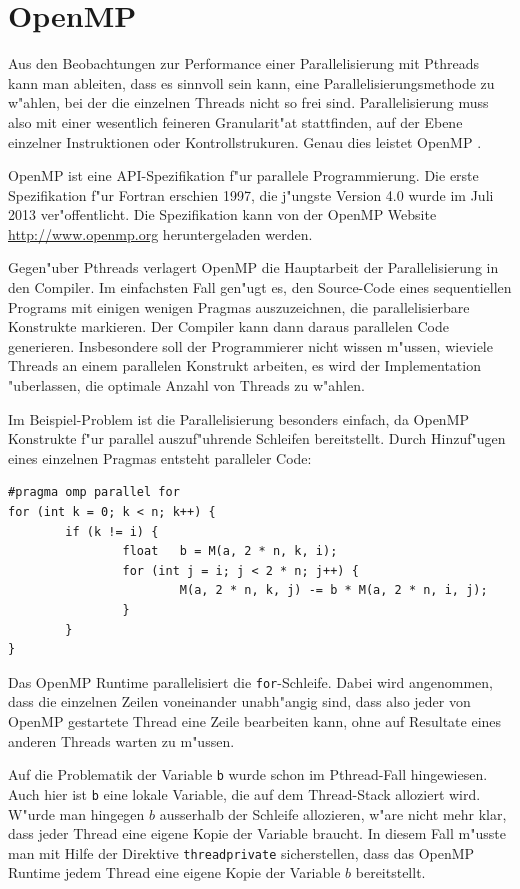 \section{OpenMP\label{openmp-intro}}
Aus den Beobachtungen zur Performance einer Parallelisierung mit
Pthreads kann man ableiten, dass es sinnvoll sein kann,
eine Parallelisierungsmethode zu w"ahlen, bei der die einzelnen
Threads nicht so frei sind.
Parallelisierung muss also mit einer wesentlich feineren Granularit"at
stattfinden, auf der Ebene einzelner Instruktionen oder Kontrollstrukuren.
Genau dies leistet OpenMP \cite{skript:openmp}.

OpenMP ist eine API-Spezifikation f"ur parallele Programmierung.
Die erste Spezifikation f"ur Fortran erschien 1997, die j"ungste 
Version 4.0 wurde im Juli 2013 ver"offentlicht.
Die Spezifikation kann von der OpenMP Website \url{http://www.openmp.org}
heruntergeladen werden.

Gegen"uber Pthreads verlagert OpenMP die Hauptarbeit der Parallelisierung
in den Compiler. 
Im einfachsten Fall gen"ugt es, den Source-Code eines sequentiellen Programs
mit einigen wenigen Pragmas auszuzeichnen, die parallelisierbare
Konstrukte markieren. Der Compiler kann dann daraus parallelen Code
generieren. Insbesondere soll der Programmierer nicht wissen m"ussen, wieviele
Threads an einem parallelen Konstrukt arbeiten, es wird der Implementation
"uberlassen, die optimale Anzahl von Threads zu w"ahlen.

Im Beispiel-Problem ist die Parallelisierung besonders einfach, da
OpenMP Konstrukte f"ur parallel auszuf"uhrende Schleifen bereitstellt.
Durch Hinzuf"ugen eines einzelnen Pragmas entsteht paralleler Code:
\begin{verbatim}
#pragma omp parallel for
for (int k = 0; k < n; k++) {
        if (k != i) {
                float   b = M(a, 2 * n, k, i);
                for (int j = i; j < 2 * n; j++) {
                        M(a, 2 * n, k, j) -= b * M(a, 2 * n, i, j);
                }
        }
}
\end{verbatim}
Das OpenMP Runtime parallelisiert die {\tt for}-Schleife. Dabei wird
angenommen, dass die einzelnen Zeilen voneinander unabh"angig sind, dass
also jeder von OpenMP gestartete Thread eine Zeile bearbeiten kann,
ohne auf Resultate eines anderen Threads warten zu m"ussen.

Auf die Problematik der Variable {\tt b} wurde schon im Pthread-Fall
hingewiesen. Auch hier ist {\tt b} eine lokale Variable, die auf
dem Thread-Stack alloziert wird. W"urde man hingegen $b$ ausserhalb
der Schleife allozieren, w"are nicht mehr klar, dass jeder Thread
eine eigene Kopie der Variable braucht. In diesem Fall m"usste man
mit Hilfe der Direktive {\tt threadprivate} sicherstellen, dass
das OpenMP Runtime jedem Thread eine eigene Kopie der Variable $b$
bereitstellt.

